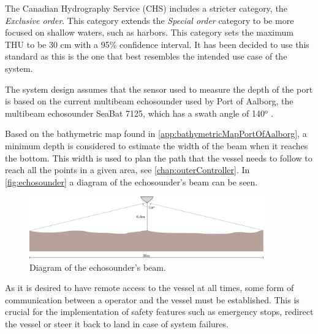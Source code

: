 The Canadian Hydrography Service (CHS) includes a stricter category, the \emph{Exclusive order}. 
This category extends the \emph{Special order} category to be more focused on shallow waters, such as harbors. 
This category sets the maximum THU to be 30 cm with a 95\% confidence interval. 
It has been decided to use this standard as this is the one that best resembles the intended use case of the system. \cite{CHS}

The system design assumes that the sensor used to measure the depth of the port is based on the current multibeam echosounder used by Port of Aalborg, the multibeam echosounder SeaBat 7125, which has a swath angle of 140$^\mathrm{o}$ \cite{echoSounder}.

Based on the bathymetric map found in \autoref{app:bathymetricMapPortOfAalborg}, a minimum depth is considered to estimate the width of the beam when it reaches the bottom. This width is used to plan the path that the vessel needs to follow to reach all the points in a given area, see \autoref{chap:outerController}. In \autoref{fig:echosounder} a diagram of the echosounder's beam can be seen.

\begin{figure}[H]
    \includegraphics[width=0.9\textwidth]{figures/echosounder}
    \caption{Diagram of the echosounder's beam.}
    \label{fig:echosounder}
\end{figure}

As it is desired to have remote access to the vessel at all times, some form of communication between a operator and the vessel must be established. This is crucial for the implementation of safety features such as emergency stops, redirect the vessel or steer it back to land in case of system failures.

